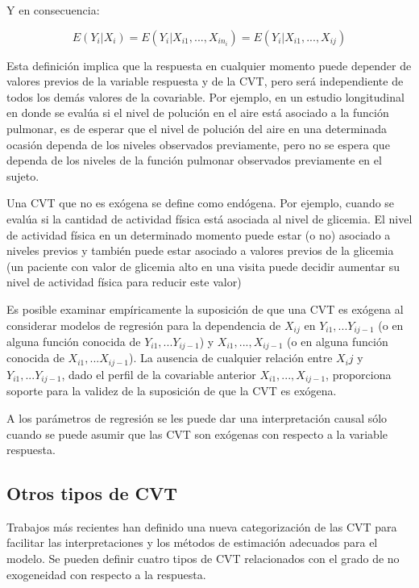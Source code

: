 \documentclass[12pt]{article}
\begin{document}
Y en consecuencia:

\begin{equation}
	\label{exogeneidad debil}
	E(Y_i|X_i) = E(Y_i|X_{i1}, ..., X_{in_i}) = E(Y_i|X_{i1}, ..., X_{ij})
\end{equation}

Esta definición implica que la respuesta en cualquier momento puede depender de valores previos de la variable respuesta
y de la CVT, pero será independiente de todos los demás valores de la covariable. Por ejemplo, en un estudio longitudinal
en donde se evalúa si el nivel de polución en el aire está asociado a la función pulmonar, es de esperar que el nivel de
polución del aire en una determinada ocasión dependa de los niveles observados previamente, pero no se espera que dependa
de los niveles de la función pulmonar observados previamente en el sujeto.

Una CVT que no es exógena se define como endógena. Por ejemplo, cuando se evalúa si la cantidad de actividad física
está asociada al nivel de glicemia. El nivel de actividad física en un determinado momento puede estar (o no) asociado
a niveles previos y también puede estar asociado a valores previos de la glicemia (un paciente con valor de glicemia
alto en una visita puede decidir aumentar su nivel de actividad física para reducir este valor)

Es posible examinar empíricamente la suposición de que una CVT es exógena al considerar modelos de regresión para la
dependencia de $X_{ij}$ en $Y_{i1}, ... Y_{ij-1}$ (o en alguna función conocida de $Y_{i1}, ... Y_{ij-1}$) y
$X_{i1}, ..., X_{ij-1}$	(o en alguna función conocida de $X_{i1}, ... X_{ij-1}$). La ausencia de cualquier relación
entre $X_ij$ y $Y_{i1}, ... Y_{ij-1}$, dado el perfil de la covariable anterior $X_{i1}, ..., X_{ij-1}$, proporciona
soporte para la validez de la suposición de que la CVT es exógena.

A los parámetros de regresión se les puede dar una interpretación causal sólo cuando se puede asumir que las CVT son
exógenas con respecto a la variable respuesta.

\subsection{Otros tipos de CVT}

Trabajos más recientes han definido una nueva categorización de las CVT para facilitar las interpretaciones y los
métodos de estimación adecuados para el modelo. Se pueden definir cuatro tipos de CVT relacionados con el grado de
no exogeneidad con respecto a la respuesta.
\end{document}
